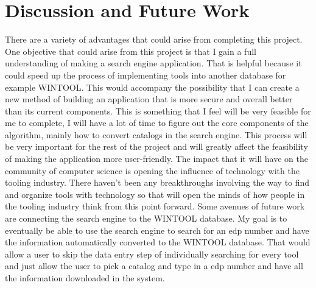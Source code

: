 %
%
%

\chapter{Discussion and Future Work}\label{ch:conclusion}

There are a variety of advantages that could arise from completing this project. One objective that could arise from this project is that I gain a full understanding of making a search engine application. That is helpful because it could speed up the process of implementing tools into another database for example WINTOOL. This would accompany the possibility that I can create a new method of building an application that is more secure and overall better than its current components. This is something that I feel will be very feasible for me to complete, I will have a lot of time to figure out the core components of the algorithm, mainly how to convert catalogs in the search engine.  This process will be very important for the rest of the project and will greatly affect the feasibility of making the application more user-friendly. The impact that it will have on the community of computer science is opening the influence of technology with the tooling industry. There haven't been any breakthroughs involving the way to find and organize tools with technology so that will open the minds of how people in the tooling industry think from this point forward. Some avenues of future work are connecting the search engine to the WINTOOL database. My goal is to eventually be able to use the search engine to search for an edp number and have the information automatically converted to the WINTOOL database. That would allow a user to skip the data entry step of individually searching for every tool and just allow the user to pick a catalog and type in a edp number and have all the information downloaded in the system. 

